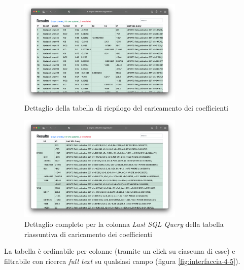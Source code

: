 \begin{figure}[H]
\centering
\includegraphics[width=0.70\textwidth,height=\textheight,keepaspectratio]{img/interfaccia_3}
\caption{Dettaglio della tabella di riepilogo del caricamento dei coefficienti}
\label{fig:interfaccia-3}
\end{figure}

\begin{figure}[H]
\centering
\includegraphics[width=0.70\textwidth,height=\textheight,keepaspectratio]{img/interfaccia_6}
\caption{Dettaglio completo per la colonna \textit{Last SQL Query} della tabella riassuntiva di caricamento dei coefficienti}
\label{fig:interfaccia-6}
\end{figure}

La tabella è ordinabile per colonne (tramite un click su ciascuna di esse) e filtrabile con ricerca \textit{full text} su qualsiasi campo (figura \ref{fig:interfaccia-4-5}).

